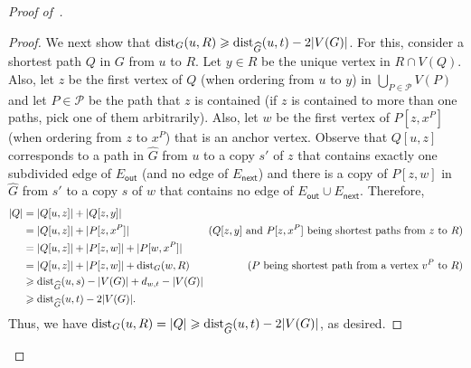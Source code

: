 \begin{proof}[Proof of~]
\begin{proof}
    We next show that $\mathrm{dist}_G(u,R)\geqslant \mathrm{dist}_{\widehat{G}}(u,t) - 2|V(G)|$.
    For this, consider a shortest path $Q$ in $G$ from $u$ to $R$. Let $y\in R$ be the unique vertex in $R\cap V(Q)$.
    Also, let $z$ be the first vertex of $Q$ (when ordering from $u$ to $y$)
    in $\bigcup_{P\in\mathcal{P}}V(P)$ and let $P\in\mathcal{P}$ be the path that $z$ is contained
    (if $z$ is contained to more than one paths, pick one of them arbitrarily).
    Also, let $w$ be the first vertex of $P[z,x^P]$ (when ordering from $z$ to $x^P$) that is an anchor vertex.
    Observe that $Q[u,z]$ corresponds to a path in $\widehat{G}$ from $u$ to a copy $s'$ of $z$
    that contains exactly one subdivided edge of $E_{\mathsf{out}}$ (and no edge of $E_{\mathsf{next}}$)
    and there is a copy of $P[z,w]$ in $\widehat{G}$ from $s'$ to a copy $s$ of $w$ 
    that contains no edge of $E_{\mathsf{out}} \cup E_{\mathsf{next}}$. 
    Therefore,
    \begin{align*}
      |Q| & = |Q[u,z]|+|Q[z,y]|& \\
      & = |Q[u,z]|+ |P[z,x^P]| & \text{\!\!\!($Q[z,y]$ and $P[z,x^P]$ being shortest paths from $z$ to $R$)}\\
      & = |Q[u,z]|+ |P[z,w]| + |P[w,x^P]|& \\
      & = |Q[u,z]|+ |P[z,w]| + \mathrm{dist}_G(w,R) & \text{($P$ being shortest path from a vertex $v^P$ to $R$)}\\
      & \geqslant \mathrm{dist}_{\widehat{G}}(u,s) - |V(G)| + d_{w,t} - |V(G)|& \\
      & \geqslant \mathrm{dist}_{\widehat{G}}(u,t) - 2|V(G)|. &  
    \end{align*} 
    Thus, we have $\mathrm{dist}_G(u,R) = |Q| \geqslant \mathrm{dist}_{\widehat{G}}(u,t)-2|V(G)|$, as desired.
  \end{proof}


\end{proof}
